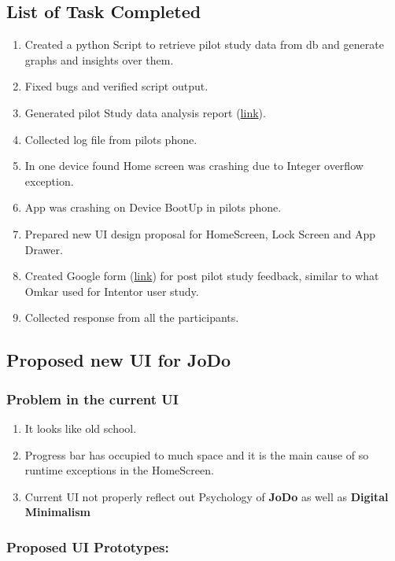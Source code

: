 \documentclass[12pt]{article}
\begin{document}
\subsection{List of Task Completed}
\begin{enumerate}
    \item Created a python Script to retrieve pilot study data from db and generate graphs and insights over them.
    \item Fixed bugs and verified script output.
    \item Generated pilot Study data analysis report (\href{https://drive.google.com/file/d/1GWn26HUfRNxbJ2xH5aLeTd6d8hEtVdlX/view?usp=sharing}{link}).
    \item Collected log file from pilots phone.
    \item In one device found Home screen was crashing due to Integer overflow exception.
    \item App was crashing on Device BootUp in pilots phone.
    \item Prepared new UI design proposal for HomeScreen, Lock Screen and App Drawer.
    \item Created Google form  (\href{https://forms.gle/D1U46AeNB6NzSw1fA}{link}) for post pilot study feedback, similar to what Omkar used for Intentor user study.
    \item Collected response from all the participants.
\end{enumerate}
\subsection{Proposed new UI for JoDo}
\subsubsection{Problem in the current UI}
\begin{enumerate}
    \item It looks like old school.
    \item Progress bar has occupied to much space and it is the main cause of so runtime exceptions in the HomeScreen.
    \item Current UI not properly reflect out Psychology of \textbf{JoDo} as well as \textbf{Digital Minimalism}
\end{enumerate}
\subsubsection{Proposed UI Prototypes:}
\end{document}
